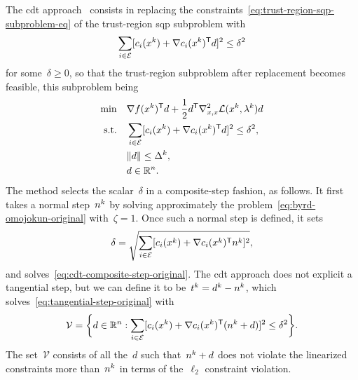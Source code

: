 The \gls{cdt} approach~\cite{Celis_1985,Celis_Dennis_Tapia_1985} consists in replacing the constraints~\cref{eq:trust-region-sqp-subproblem-eq} of the trust-region \gls{sqp} subproblem with
\begin{equation*}
    \sum_{i \in \ieq} [\con{i}(\iter[k]) + \nabla \con{i}(\iter[k])^{\T} \step]^2 \le \delta^2
\end{equation*}
for some~$\delta \ge 0$, so that the trust-region subproblem after replacement becomes feasible, this subproblem being
\begin{subequations}
    \label{eq:cdt-composite-step-original}
    \begin{align}
        \min        & \quad \nabla \obj(\iter[k])^{\T} \step + \frac{1}{2} \step^{\T} \nabla_{x, x}^2 \lag(\iter[k], \lm[k]) \step\\
        \text{s.t.} & \quad \sum_{i \in \ieq} [\con{i}(\iter[k]) + \nabla \con{i}(\iter[k])^{\T} \step]^2 \le \delta^2, \label{eq:cdt-composite-step-original-eq}\\
                    & \quad \norm{\step} \le \rad[k], \label{eq:cdt-composite-step-original-tr}\\
                    & \quad \step \in \R^n. \nonumber
    \end{align}
\end{subequations}
The method selects the scalar~$\delta$ in a composite-step fashion, as follows.
It first takes a normal step~$\nstep[k]$ by solving approximately the problem~\cref{eq:byrd-omojokun-original} with~$\zeta = 1$.
Once such a normal step is defined, it sets
\begin{equation*}
    \delta = \sqrt{\sum_{i \in \ieq} [\con{i}(\iter[k]) + \nabla \con{i}(\iter[k])^{\T} \nstep[k]]^2},
\end{equation*}
and solves~\cref{eq:cdt-composite-step-original}.
The \gls{cdt} approach does not explicit a tangential step, but we can define it to be~$\tstep[k] = \step[k] - \nstep[k]$, which solves~\cref{eq:tangential-step-original} with
\begin{equation*}
    \mathcal{V} = \set[\bigg]{d \in \R^n : \sum_{i \in \ieq} [\con{i}(\iter[k]) + \nabla \con{i}(\iter[k])^{\T} (\nstep[k] + \step)]^2 \le \delta^2}.
\end{equation*}
The set~$\mathcal{V}$ consists of all the~$d$ such that~$\nstep[k] + d$ does not violate the linearized constraints more than~$\nstep[k]$ in terms of the~$\ell_2$ constraint violation.

